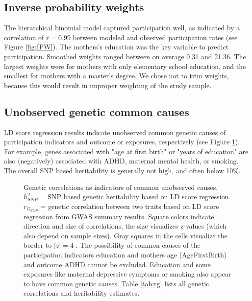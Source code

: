 \documentclass[]{article}
\begin{document}
\subsection*{Inverse probability weights}
The hierarchical binomial model captured participation well, as indicated by a correlation of $r=0.99$ between modeled and observed participation rates (see Figure \ref{fig:IPW}). The mothers's education was the key variable to predict participation. Smoothed weights ranged between on average 0.31 and 21.36. The largest weights were for mothers with only elementary school education, and the smallest for mothers with a master's degree. We chose not to trim weights, because this would result in improper weighting of the study sample.

\subsection*{Unobserved genetic common causes}
LD score regression results indicate unobserved common genetic causes of participation indicators and outcome or exposures, respectively (see Figure \ref{fig:rg}). For example, genes associated with "age at first birth" or "years of education" are also (negatively) associated with ADHD, maternal mental health, or smoking. The overall SNP based heritability is generally not high, and often below 10\%.

\begin{figure}
	\begin{center}
		
	\end{center}
	\caption{Genetic correlations as indicators of common unobserved causes. $h^2_{SNP}$ = SNP based genetic heritability based on LD score regression. $r_{G_{SNP}}$ = genetic correlation between two traits based on LD score regression from GWAS summary results. Square colors indicate direction and size of correlations, the size visualizes z-values (which also depend on sample sizes). Gray squares in the cells visualize the border to $|z|=4$ . The possibility of common causes of the participation indicators education and mothers age (AgeFirstBirth) and outcome ADHD cannot be excluded. Education and some exposures like maternal depressive symptoms or smoking also appear to have common genetic causes. Table \ref{tab:rg} lists all genetic correlations and heritability estimates.}
	\label{fig:rg}
\end{figure}
\end{document}
